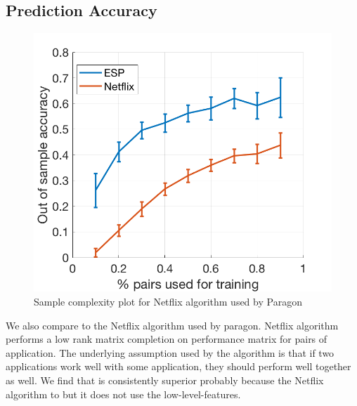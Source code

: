 \subsection{\SYSTEM{} Prediction Accuracy}
\label{sec:st_model}
\begin{figure}[!t]
\begin{center}
 \includegraphics[width=0.7\columnwidth]{figures/accuracy_netflix_vs_esp.png}
 \caption{\small Sample complexity plot for Netflix algorithm used by Paragon}
\label{fig:expt:accuracy_netlix}
\end{center}
\end{figure}

We also compare \SYSTEM{} to the Netflix algorithm used by paragon. Netflix algorithm
performs a low rank matrix completion on performance matrix for pairs of application.
The underlying assumption used by the algorithm is that if two applications work well
with some application, they should perform well together as well. We find that \SYSTEM{}
is consistently superior probably because the Netflix algorithm to  but it does not use the low-level-features.

